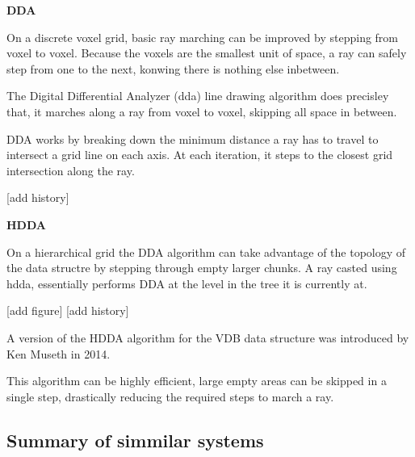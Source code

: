 \vspace{0.5cm}
\label{def:dda}
\textbf{DDA}

On a discrete voxel grid, basic ray marching can be improved by stepping from voxel to voxel. Because the voxels are the smallest unit of space, a ray can safely step from one to the next, konwing there is nothing else inbetween.

The Digital Differential Analyzer (\acrshort{dda}) line drawing algorithm does precisley that, it marches along a ray from voxel to voxel, skipping all space in between.

DDA works by breaking down the minimum distance a ray has to travel to intersect a grid line on each axis.
At each iteration, it steps to the closest grid intersection along the ray.

[add history]

\vspace{0.5cm}
\label{def:hdda}
\textbf{HDDA}

On a hierarchical grid the DDA algorithm can take advantage of the topology of the data structre by stepping through empty larger chunks.
A ray casted using \acrshort{hdda}, essentially performs DDA at the level in the tree it is currently at.

[add figure]
[add history]

A version of the HDDA algorithm for the VDB data structure was introduced by Ken Museth in 2014\supercite{vdb2014}.

This algorithm can be highly efficient, large empty areas can be skipped in a single step, drastically reducing the required steps to march a ray.

\subsection{Summary of simmilar systems}

